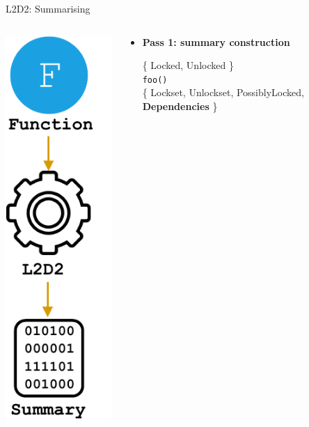 \documentclass[10pt, usenames, dvipsnames, aspectratio=169]{beamer}
\begin{document}
\begin{frame}{L2D2: Summarising}
    \vspace{1em}

    \begin{columns}
        \begin{column}{0.07 \textwidth}
           \includegraphics[scale=0.7]{images/summary.pdf}
        \end{column}

        \begin{column}{0.95 \textwidth}
            \begin{itemize}
                \item
                    \large{\textbf{Pass 1: summary construction}} \\
                    \begin{center}
                        \large{\{ Locked, Unlocked \} \\}
                        \texttt{foo()} \\
                        \large{\{ Lockset, Unlockset, PossiblyLocked,
                        \alert{\textbf{Dependencies}} \}}
                    \end{center}


\end{itemize}
\end{column}
\end{columns}
\end{frame}
\end{document}

